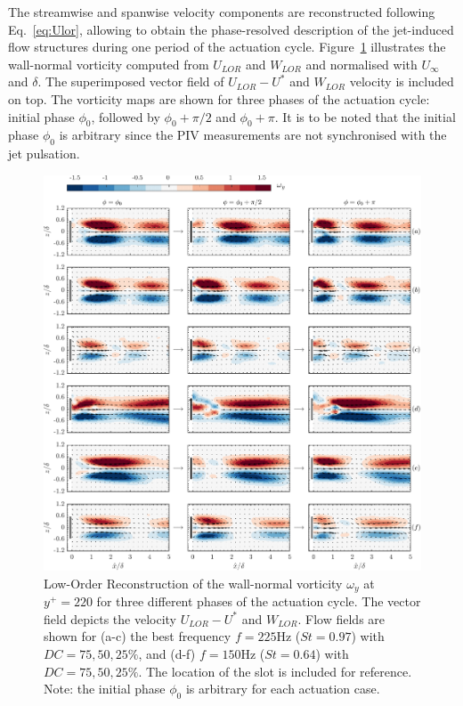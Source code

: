 The streamwise and spanwise velocity components are reconstructed following Eq.~\eqref{eq:Ulor}, allowing to obtain the phase-resolved description of the jet-induced flow structures during one period of the actuation cycle. Figure~\ref{fig:omega_lor_POD} illustrates the wall-normal vorticity computed from $U_{LOR}$ and $W_{LOR}$ and normalised with $U_\infty$ and $\delta$. The superimposed vector field of $U_{LOR}-U^*$ and $W_{LOR}$ velocity is included on top. The vorticity maps are shown for three phases of the actuation cycle: initial phase $\phi_0$, followed by $\phi_0+\pi/2$ and $\phi_0+\pi$. It is to be noted that the initial phase $\phi_0$ is arbitrary since the PIV measurements are not synchronised with the jet pulsation.
%
\begin{figure}
    \centering
    \includegraphics[width=0.99\linewidth]{figures/F12.pdf}
    \caption{Low-Order Reconstruction of the wall-normal vorticity $\omega_y$ at $y^+ = 220$ for three different phases of the actuation cycle. The vector field depicts the velocity $U_{LOR}-U^*$ and $W_{LOR}$. Flow fields are shown for (a-c) the best frequency $f=225\mathrm{Hz}$ ($St = 0.97$) with $DC = 75,50,25\% $, and (d-f) $f=150\mathrm{Hz}$ ($St = 0.64$) with $DC = 75,50,25\% $. The location of the slot  is included for reference. Note: the initial phase $\phi_0$ is arbitrary for each actuation case.}
    \label{fig:omega_lor_POD}
\end{figure}

